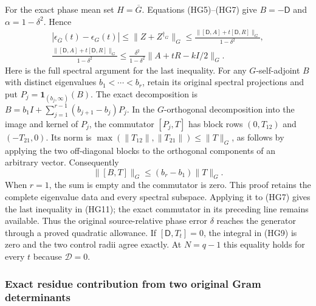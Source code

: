 For the exact phase mean set $H=\overline G$. Equations (HG5)--(HG7)
give $B=-\mathsf D$ and $\alpha=1-\delta^2$. Hence
\[
\begin{gathered}
 |\epsilon_{\overline G}(t)-\epsilon_G(t)|
 \le\|Z+Z^{\dagger_G}\|_G
 \le\frac{\|[\mathsf D,A]+t[\mathsf D,R]\|_G}{1-\delta^2},\\
 \frac{\|[\mathsf D,A]+t[\mathsf D,R]\|_G}{1-\delta^2}
 \le\frac{\delta^2}{1-\delta^2}\|A+tR-kI/2\|_G .
\end{gathered}\tag{HG11}
\]
Here is the full spectral argument for the last inequality. For any
$G$-self-adjoint $B$ with distinct eigenvalues
$b_1<\cdots<b_r$, retain its original spectral projections and put
$P_j=\mathbf1_{(b_j,\infty)}(B)$. The exact decomposition is
$B=b_1I+\sum_{j=1}^{r-1}(b_{j+1}-b_j)P_j$.
In the $G$-orthogonal decomposition into the image and kernel of
$P_j$, the commutator $[P_j,T]$ has block rows $(0,T_{12})$
and $(-T_{21},0)$. Its norm is
$\max(\|T_{12}\|,\|T_{21}\|)\le\|T\|_G$, as follows by
applying the two off-diagonal blocks to the orthogonal components of
an arbitrary vector. Consequently
\[
 \|[B,T]\|_G\le (b_r-b_1)\|T\|_G .\tag{HG11a}
\]
When $r=1$, the sum is empty and the commutator is zero.
This proof retains the complete eigenvalue data and every spectral
subspace. Applying it to (HG7) gives the last inequality in (HG11);
the exact commutator in its preceding line remains available.
Thus the original
source-relative phase error $\delta$ reaches the generator through
a proved quadratic allowance. If $[\mathsf D,T_t]=0$, the integral
in (HG9) is zero and the two control radii agree exactly. At $N=q-1$
this equality holds for every $t$ because $\mathscr D=0$.

\subsubsection{Exact residue contribution from two original Gram determinants}

